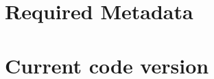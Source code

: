 \documentclass[preprint,12pt, a4paper]{elsarticle}
\begin{document}



 



\section*{Required Metadata}\label{sec:metadata}


\section*{Current code version}\label{sec:src_version}
\end{document}
